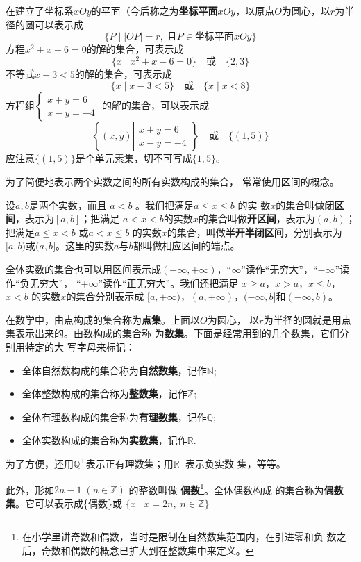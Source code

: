 在建立了坐标系$xOy$的平面（今后称之为\textbf{坐标平面}$xOy$，以原点$O$为圆心，以$r$为半径的圆可以表示成
\[\{P\mid  |OP|=r,\; \text{且}P\in \text{坐标平面}xOy\}\]
方程$x^2+x-6=0$的解的集合，可表示成
\[\{x\mid x^2+x-6=0\}\quad \text{或}\quad \{2,3\}\]
不等式$x-3<5$的解的集合，可表示成
\[\{x\mid x-3<5\}\quad \text{或}\quad \{x\mid x<8\}\]
方程组$\begin{cases}
    x+y=6\\x-y=-4
\end{cases}$
的解的集合，可以表示成
\[\left\{(x,y)\left|\begin{array}{l}
    x+y=6\\x-y=-4
\end{array}\right.\right\}\quad \text{或}\quad \{(1,5)\}\]
应注意$\{(1,5)\}$是个单元素集，切不可写成$\{1,5\}$。

为了简便地表示两个实数之间的所有实数构成的集合，
常常使用区间的概念。

设$a,b$是两个实数，而且
$a<b$
。我们把满足$a\le x\le b$
的实
数$x$的集合叫做\textbf{闭区间}，表示为$[a,b]$；把满足
$a<x<b$的实数$x$的集合叫做\textbf{开区间}，表示为$(a,b)$；
把满足$a\le x<b$
或$a<x\le b$
的实数$x$的集合，叫做\textbf{半开半闭区间}，分别表示为
$[a,b)$或$(a,b]$。这里的实数$a$与$b$都叫做相应区间的端点。

全体实数的集合也可以用区间表示成$(-\infty,+\infty)$，“$\infty$”读作“无穷大”，“$-\infty$”读作“负无穷大”，
“$+\infty$”读作“正无穷大”。我们还把满足
$x\ge a$，$x>a$，$x\le b$，$x<b$
的实数$x$的集合分别表示成
$[a,+\infty)$，$(a,+\infty)$，$(-\infty,b]$和$(-\infty, b)$。

在数学中，由点构成的集合称为\textbf{点集}。上面以$O$为圆心，
以$r$为半径的圆就是用点集表示出来的。由数构成的集合称
为\textbf{数集}。下面是经常用到的几个数集，它们分别用特定的大
写字母来标记：
\begin{itemize}
\item 全体自然数构成的集合称为\textbf{自然数集}，记作$\mathbb{N}$;
\item 全体整数构成的集合称为\textbf{整数集}，记作$\mathbb{Z}$;
\item 全体有理数构成的集合称为\textbf{有理数集}，记作$\mathbb{Q}$;
\item 全体实数构成的集合称为\textbf{实数集}，记作$\mathbb{R}$.
\end{itemize}

为了方便，还用$\mathbb{Q}^+$表示正有理数集；用$\mathbb{R}^-$表示负实数
集，等等。

此外，形如$2n-1\; (n\in\mathbb{Z})$
的整数叫做 \textbf{偶数}\footnote{在小学里讲奇数和偶数，当时是限制在自然数集范围内，在引进零和负
数之后，奇数和偶数的概念已扩大到在整数集中来定义。}。全体偶数构成
的集合称为\textbf{偶数集}。它可以表示成\{偶数\}或
$\{x\mid x=2n,\; n\in\mathbb{Z}\}$

